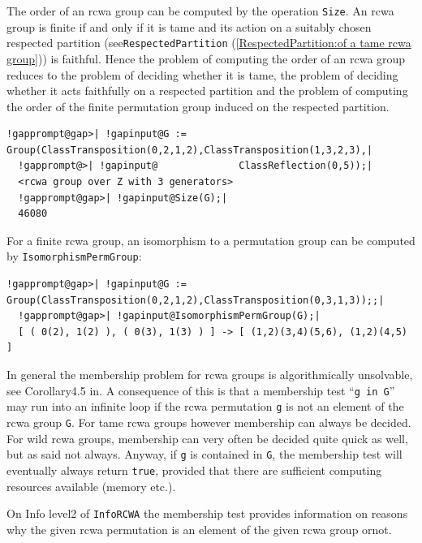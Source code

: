 \documentclass[a4paper,11pt]{report}
\begin{document}
{{  The order of an rcwa group can be computed by the operation \texttt{Size}. An rcwa group is finite if and only if it is tame and its action on a
suitably chosen respected partition (see{\nobreakspace}\texttt{RespectedPartition} (\ref{RespectedPartition:of a tame rcwa group})) is faithful. Hence the problem of computing the order of an rcwa group
reduces to the problem of deciding whether it is tame, the problem of deciding
whether it acts faithfully on a respected partition and the problem of
computing the order of the finite permutation group induced on the respected
partition. 
\begin{Verbatim}[commandchars=!@|,fontsize=\small,frame=single,label=Example]
  !gapprompt@gap>| !gapinput@G := Group(ClassTransposition(0,2,1,2),ClassTransposition(1,3,2,3),|
  !gapprompt@>| !gapinput@              ClassReflection(0,5));|
  <rcwa group over Z with 3 generators>
  !gapprompt@gap>| !gapinput@Size(G);|
  46080
\end{Verbatim}
  For a finite rcwa group, an isomorphism to a permutation group can be computed
by \texttt{IsomorphismPermGroup}: 
\begin{Verbatim}[commandchars=!@|,fontsize=\small,frame=single,label=Example]
  !gapprompt@gap>| !gapinput@G := Group(ClassTransposition(0,2,1,2),ClassTransposition(0,3,1,3));;|
  !gapprompt@gap>| !gapinput@IsomorphismPermGroup(G);|
  [ ( 0(2), 1(2) ), ( 0(3), 1(3) ) ] -> [ (1,2)(3,4)(5,6), (1,2)(4,5) ]
\end{Verbatim}
   In general the membership problem for rcwa groups is algorithmically
unsolvable, see Corollary{\nobreakspace}4.5 in{\nobreakspace}\cite{Kohl09}. A consequence of this is that a membership test ``\texttt{g in G}'' may run into an infinite loop if the rcwa permutation \texttt{g} is not an element of the rcwa group \texttt{G}. For tame rcwa groups however membership can always be decided. For wild rcwa
groups, membership can very often be decided quite quick as well, but
\texttt{}\texttt{} as said
\texttt{}\texttt{} not always. Anyway, if \texttt{g} is contained in \texttt{G}, the membership test will eventually always return \texttt{true}, provided that there are sufficient computing resources available (memory
etc.). 

 On Info level{\nobreakspace}2 of \texttt{InfoRCWA} the membership test provides information on reasons why the given rcwa
permutation is an element of the given rcwa group or{\nobreakspace}not. 

}}
\end{document}
